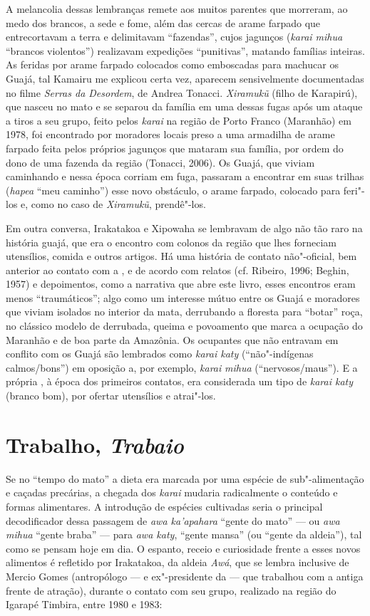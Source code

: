 A melancolia dessas lembranças remete aos muitos parentes que morreram,
ao medo dos brancos, a sede e fome, além das cercas de arame farpado que
entrecortavam a terra e delimitavam ``fazendas'', cujos jagunços
(\emph{karai mihua} ``brancos violentos'') realizavam expedições
``punitivas'', matando famílias inteiras. As feridas por arame farpado
colocados como emboscadas para machucar os Guajá, tal Kamairu me
explicou certa vez, aparecem sensivelmente documentadas no filme
\emph{Serras da Desordem}, de Andrea Tonacci. \emph{Xiramukũ} (filho de
Karapirú), que nasceu no mato e se separou da família em uma dessas
fugas após um ataque a tiros a seu grupo, feito pelos \emph{karai} na
região de Porto Franco (Maranhão) em 1978, foi encontrado por moradores
locais preso a uma armadilha de arame farpado feita pelos próprios
jagunços que mataram sua família, por ordem do dono de uma fazenda da
região (Tonacci, 2006). Os Guajá, que viviam caminhando e nessa época
corriam em fuga, passaram a encontrar em suas trilhas (\emph{hapea}
``meu caminho'') esse novo obstáculo, o arame farpado, colocado para
feri"-los e, como no caso de \emph{Xiramukũ}, prendê"-los.

Em outra conversa, Irakatakoa e Xipowaha se lembravam de algo não tão
raro na história guajá, que era o encontro com colonos da região que
lhes forneciam utensílios, comida e outros artigos. Há uma história de
contato não"-oficial, bem anterior ao contato com a , e de acordo
com relatos (cf. Ribeiro, 1996; Beghin, 1957) e depoimentos, como a
narrativa que abre este livro, esses encontros eram menos ``traumáticos'';
algo como um interesse mútuo entre os Guajá e moradores que viviam
isolados no interior da mata, derrubando a floresta para ``botar'' roça,
no clássico modelo de derrubada, queima e povoamento que marca a
ocupação do Maranhão e de boa parte da Amazônia. Os ocupantes que não
entravam em conflito com os Guajá são lembrados como \emph{karai katy}
(``não"-indígenas calmos/bons'') em oposição a, por exemplo, \emph{karai}
\emph{mihua} (``nervosos/maus''). E a própria , à época dos
primeiros contatos, era considerada um tipo de \emph{karai katy} (branco
bom), por ofertar utensílios e atrai"-los.

\section{Trabalho, \emph{Trabaio}}

Se no ``tempo do mato'' a dieta era marcada por uma espécie de
sub"-alimentação e caçadas precárias, a chegada dos \emph{karai} mudaria
radicalmente o conteúdo e formas alimentares. A introdução de espécies
cultivadas seria o principal decodificador dessa passagem de \emph{awa
ka'apahara} ``gente do mato'' --- ou \emph{awa mihua} ``gente braba'' ---
para \emph{awa katy}, ``gente mansa'' (ou ``gente da aldeia''), tal como
se pensam hoje em dia. O espanto, receio e curiosidade frente a esses
novos alimentos é refletido por Irakatakoa, da aldeia \emph{Awá}, que se
lembra inclusive de Mercio Gomes (antropólogo --- e ex"-presidente da 
--- que trabalhou com a antiga frente de atração), durante o contato com
seu grupo, realizado na região do Igarapé Timbira, entre 1980 e 1983:

